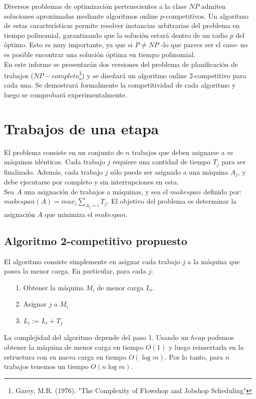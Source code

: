 \documentclass[12pt,letterpaper]{article}
\begin{document}
	Diversos problemas de optimización pertenecientes a la clase $NP$ admiten soluciones aproximadas mediante algoritmos online $p$-competitivos. Un algoritmo de estas características permite resolver instancias arbitrarias del problema en tiempo polinomial, garantizando que la solución estará dentro de un radio $p$ del óptimo. Esto es muy importante, ya que si $P \not= NP$ -lo que parece ser el caso- no es posible encontrar una solución óptima en tiempo polinomial. \\
	
	En este informe se presentarán dos versiones del problema de planificación de trabajos ($NP-completo$\footnote{Garey, M.R. (1976). "The Complexity of Flowshop and Jobshop Scheduling"}) y se diseñará un algoritmo online 2-competitivo para cada una. Se demostrará formalmente la competitividad de cada algoritmo y luego se comprobará experimentalmente.

\section{Trabajos de una etapa}
	El problema consiste en un conjunto de $n$ trabajos que deben asignarse a $m$ máquinas idénticas. Cada trabajo $j$ requiere una cantidad de tiempo $T_{j}$ para ser finalizado. Además, cada trabajo $j$ sólo puede ser asignado a una máquina $A_{j}$, y debe ejecutarse por completo y sin interrupciones en esta.\\
	
Sea $A$ una asignación de trabajos a máquinas, y sea el $makespan$ definido por: $makespan(A) = max_{i} \sum_{A_{j}=i} T_{j}$. El objetivo del problema es determinar la asignación $A$ que minimiza el $makespan$.

\subsection{Algoritmo 2-competitivo propuesto}
\label{sec:prop-alg1}
	El algoritmo consiste simplemente en asignar cada trabajo $j$ a la máquina que posea la menor carga. En particular, para cada $j$:
\begin{itemize}
\item[1.] Obtener la máquina $M_{i}$ de menor carga $L_{i}$.
\item[2.] Asignar $j$ a $M_{i}$
\item[3.] $L_{i} := L_{i} + T_{j}$
\end{itemize}

	La complejidad del algoritmo depende del paso 1. Usando un $heap$ podemos obtener la máquina de menor carga en tiempo $O(1)$ y luego reinsertarla en la estructura con su nueva carga en tiempo $O(\log{m})$. Por lo tanto, para $n$ trabajos tenemos un tiempo $O(n \log{m})$.
\end{document}
